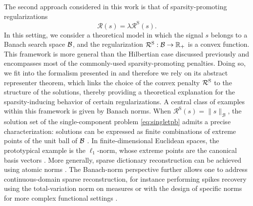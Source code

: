 \documentclass[12pt]{article}
\begin{document}
    The second approach considered in this work is that of sparsity-promoting regularizations
    \begin{equation*}
        \mathcal{R}(s) = \lambda \mathcal{R}^\mathrm{S}(s).
    \end{equation*}
    In this setting, we consider a theoretical model in which the signal $s$ belongs to a Banach search space $\mathcal{B}$, and the regularization $\mathcal{R}^\mathrm{S}: \mathcal{B} \to \mathbb{R}_+$ is a convex function. This framework is more general than the Hilbertian case discussed previously and encompasses most of the commonly-used sparsity-promoting penalties.
    Doing so, we fit into the formalism presented in \cite{boyer2019representer} and therefore we rely on its abstract representer theorem, which links the choice of the convex penalty $\mathcal{R}^\mathrm{S}$ to the structure of the solutions, thereby providing a theoretical explanation for the sparsity-inducing behavior of certain regularizations.
    A central class of examples within this framework is given by Banach norms. When $\mathcal{R}^\mathrm{S} (s) = \| s \|_{\mathcal{B}}$, the solution set of the single-component problem \eqref{eq:singletpb} admits a precise characterization: solutions can be expressed as finite combinations of extreme points of the unit ball of $\mathcal{B}$ \cite{Unser2020,bredies2020sparsity}. In finite-dimensional Euclidean spaces, the prototypical example is the $\ell_1$-norm, whose extreme points are the canonical basis vectors \cite{tibshirani1996regression,chen2001atomic}. More generally, sparse dictionary reconstruction can be achieved using atomic norms \cite{chandrasekaran2012convex}.
    The Banach-norm perspective further allows one to address continuous-domain sparse reconstruction, for instance performing spikes recovery using the total-variation norm on measures \cite{laville2021sparse} or with the design of specific norms for more complex functional settings \cite{laville2023a,ambrosio2023,decastro2024}.
\end{document}
